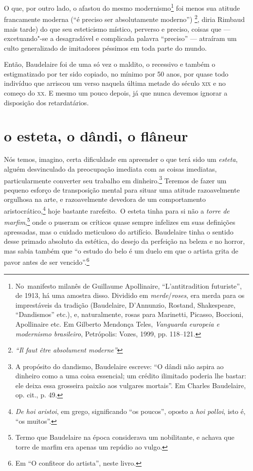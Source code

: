 O que, por outro lado, o afastou do mesmo modernismo\footnote{ No~manifesto 
milanês de Guillaume Apollinaire, “L’antitradition
futuriste”, de 1913, há uma amostra disso. Dividido em \textit{merde}/\textit{roses}, era
merda para os imprestáveis da tradição (Baudelaire, D’Annunzio,
Rostand, Shakespeare, “Dandismos” etc.), e, naturalmente, rosas para
Marinetti, Picasso, Boccioni, Apollinaire etc. Em Gilberto Mendonça Teles,
\textit{Vanguarda europeia e modernismo brasileiro}, Petrópolis:
Vozes, 1999, pp. 118--121.} foi menos sua atitude francamente
moderna (“é preciso ser absolutamente moderno”) \footnote{ 
\textit{“Il faut être absolument moderne”}}, diria Rimbaud mais
tarde) do que seu esteticismo místico, perverso e preciso, coisas que ---
excetuando"-se a desagradável e complicada palavra “preciso” ---
atraíram um culto generalizado de imitadores péssimos em toda parte do
mundo. 

Então, Baudelaire foi de uma só vez o maldito, o recessivo e também o
estigmatizado por ter sido copiado, no mínimo por 50 anos, por quase
todo indivíduo que arriscou um verso naquela última metade do século
\textsc{xix} e no começo do \textsc{xx}. E mesmo um pouco depois, 
já que nunca devemos ignorar a disposição dos retardatários.

\section*{o esteta, o dândi, o flâneur}
Nós temos, imagino, certa dificuldade em apreender o que terá sido um
\textit{esteta}, alguém desvinculado da preocupação imediata com as
coisas imediatas, particularmente converter seu trabalho em
dinheiro.\footnote{ A propósito do dandismo, Baudelaire escreve: “O
dândi não aspira ao dinheiro como a uma coisa essencial; um crédito
ilimitado poderia lhe bastar: ele deixa essa grosseira paixão aos
vulgares mortais”. Em Charles Baudelaire, op. cit., p. 49.} 
Teremos de fazer um pequeno esforço de
transposição mental para situar uma atitude razoavelmente orgulhosa na
arte, e razoavelmente devedora de um comportamento
aristocrático,\footnote{ 
\textit{De hoi aristoi}, em grego, significando “os
poucos”, oposto a \textit{hoi polloi}, isto é, “os muitos”.}
hoje bastante rarefeito.~O esteta tinha para si não a \textit{torre de marfim},\footnote{ Termo que Baudelaire
na época considerava um nobilitante, e achava que torre de marfim era apenas um repúdio ao vulgo.} 
onde o puseram os críticos quase sempre infelizes em suas definições
apressadas, mas o cuidado meticuloso do artifício. Baudelaire tinha o
sentido desse primado absoluto da estética, do desejo da perfeição na
beleza e no horror, mas sabia também que “o estudo do belo é um duelo
em que o artista grita de pavor antes de ser vencido”.\footnote{ Em “O
confiteor do artista”, neste livro.}

